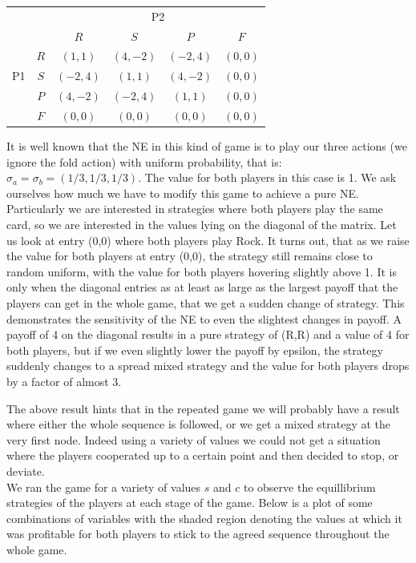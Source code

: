 \documentclass[11pt]{article}
\begin{document}
\begin{table}[htb]
\begin{tabular}{cc|c|c|c|c|}
  & \multicolumn{1}{c}{} & \multicolumn{4}{c}{P2} \\
  & \multicolumn{1}{c}{} & \multicolumn{1}{c}{$R$}  & \multicolumn{1}{c}{$S$}  & \multicolumn{1}{c}{$P$}  & \multicolumn{1}{c}{$F$}\\\cline{3-6}
            & $R$ & $(1,1)$ & $(4,-2)$ & $(-2,4)$ & $(0,0)$ \\ \cline{3-6}
P1          & $S$ & $(-2,4)$ & $(1,1)$ & $(4,-2)$& $(0,0)$ \\\cline{3-6}
            & $P$ & $(4,-2)$ & $(-2,4)$ & $(1,1)$ & $(0,0)$ \\\cline{3-6}
            & $F$ & $(0,0)$ & $(0,0)$ & $(0,0)$ & $(0,0)$ \\\cline{3-6}
\end{tabular}
\end{table}

It is well known that the NE in this kind of game is to play our three actions (we ignore the fold action) with uniform probability, that is:
$\sigma_a = \sigma_b = (1/3,1/3,1/3)$. The value for both players in this case is 1. We ask ourselves how much we have to modify this game to achieve a pure NE. Particularly we are interested in strategies where both players play the same card, so we are interested in the values lying on the diagonal of the matrix. Let us look at entry (0,0) where both players play Rock. It turns out, that as we raise the value for both players at entry (0,0),  the strategy still remains close to random uniform, with the value for both players hovering slightly above 1. It is only when the diagonal entries as at least as large as the largest payoff that the players can get in the whole game, that we get a sudden change of strategy. This demonstrates the sensitivity of the NE to even the slightest changes in payoff. A payoff of 4 on the diagonal results in a pure strategy of (R,R) and a value of 4 for both players, but if we even slightly lower the payoff by epsilon, the strategy suddenly changes to a spread mixed strategy and the value for both players drops by a factor of almost 3. 

\vspace{2mm}

The above result hints that in the repeated game we will probably have a result where either the whole sequence is followed, or we get a mixed strategy at the very first node. Indeed using a variety of values we could not get a situation where the players cooperated up to a certain point and then decided to stop, or deviate.\\
We ran the game for a variety of values $s$ and $c$ to observe the equillibrium strategies of the players at each stage of the game. Below is a plot of some combinations of variables with the shaded region denoting the values at which it was profitable for both players to stick to the agreed sequence throughout the whole game. 
\end{document}
